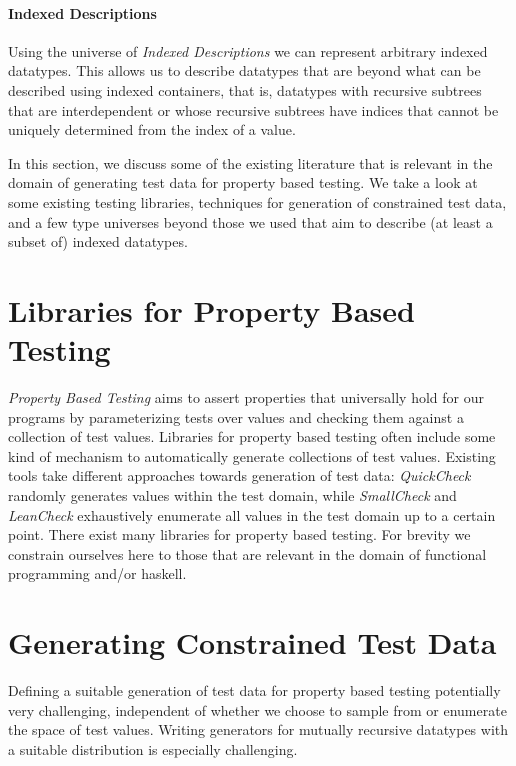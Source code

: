 \documentclass[a4paper,msc,twosized=semi]{uustthesis}
\begin{document}
  \paragraph{Indexed Descriptions}
    Using the universe of \emph{Indexed Descriptions} \cite{dagand2013cosmology}
    we can represent arbitrary indexed datatypes. This allows us to describe 
    datatypes that are beyond what can be described using indexed containers, 
    that is, datatypes with recursive subtrees that are interdependent or whose 
    recursive subtrees have indices that cannot be uniquely determined from the 
    index of a value. 

    In this section, we discuss some of the existing literature that is relevant in the 
domain of generating test data for property based testing. We take a look at some 
existing testing libraries, techniques for generation of constrained test data, and a 
few type universes beyond those we used that aim to describe (at least a subset of) 
indexed datatypes. 

\section{Libraries for Property Based Testing}

  \textit{Property Based Testing} aims to assert properties that universally hold for 
  our programs by parameterizing tests over values and checking them against a 
  collection of test values. Libraries for property based testing often include some 
  kind of mechanism to automatically generate collections of test values. Existing 
  tools take different approaches towards generation of test data: \textit{QuickCheck} 
  \cite{claessen2011quickcheck} randomly generates values within the test domain, 
  while \textit{SmallCheck} \cite{runciman2008smallcheck} and \textit{LeanCheck} \cite
  {matela2017tools} exhaustively enumerate all values in the test domain up to a 
  certain point. There exist many libraries for property based testing. For brevity we 
  constrain ourselves here to those that are relevant in the domain of functional 
  programming and/or haskell. 

\section{Generating Constrained Test Data}\label{genconstrainedtd}

  Defining a suitable generation of test data for property based testing potentially very challenging, independent of whether we choose to sample from 
  or enumerate the space of test values. Writing generators for mutually recursive 
  datatypes with a suitable distribution is especially challenging. 
    
\end{document}
